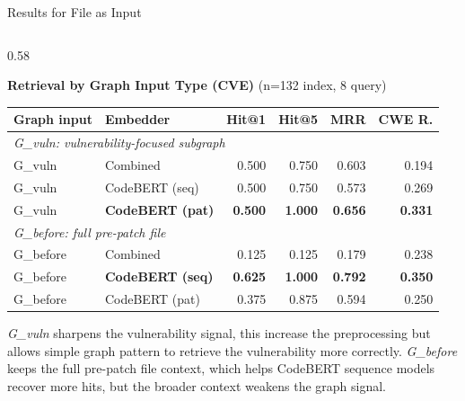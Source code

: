 \documentclass[aspectratio=169,10pt]{beamer}
\begin{document}
\begin{frame}{Results for File as Input }

  \begin{columns}[T]
    \begin{column}{0.58\textwidth}

  \begin{center}
    {\small\textbf{Retrieval by Graph Input Type (CVE)} {\scriptsize(n=132 index, 8 query)} }\\[4pt]
  {\scriptsize
  \renewcommand{\arraystretch}{1.22}
  \setlength{\tabcolsep}{3.2pt}
    \begin{tabular}{llrrrr}
      \toprule
      \textbf{Graph input} & \textbf{Embedder} & \textbf{Hit@1} & \textbf{Hit@5} & \textbf{MRR} & \textbf{CWE R.} \\
      \midrule
      \multicolumn{6}{l}{\textit{G\_vuln: vulnerability-focused subgraph}} \\
      G\_vuln & Combined & 0.500 & 0.750 & 0.603 & 0.194 \\
      G\_vuln & CodeBERT (seq) & 0.500 & 0.750 & 0.573 & 0.269 \\
      G\_vuln & \textbf{CodeBERT (pat)} & \textbf{0.500} & \textbf{1.000} & \textbf{0.656} & \textbf{0.331} \\
      \midrule
      \multicolumn{6}{l}{\textit{G\_before: full pre-patch file}} \\
      G\_before & Combined & 0.125 & 0.125 & 0.179 & 0.238 \\
      G\_before & \textbf{CodeBERT (seq)} & \textbf{0.625} & \textbf{1.000} & \textbf{0.792} & \textbf{0.350} \\
      G\_before & CodeBERT (pat) & 0.375 & 0.875 & 0.594 & 0.250 \\
      \bottomrule
    \end{tabular}}
  \end{center}

  \vspace{0.35em}
  \begin{tcolorbox}[colback=warn!5, colframe=warn!70!black, boxrule=0.35pt,
    left=3pt, right=3pt, top=2pt, bottom=1pt, arc=2pt, width=\linewidth]
    \scriptsize
    \textit{G\_vuln} sharpens the vulnerability signal, this increase the preprocessing but allows simple graph pattern to retrieve the vulnerability more correctly.
    \textit{G\_before} keeps the full pre-patch file context, which helps CodeBERT sequence models recover more hits, but the broader context weakens the graph signal.



\end{tcolorbox}
\end{column}
\end{columns}
\end{frame}
\end{document}
